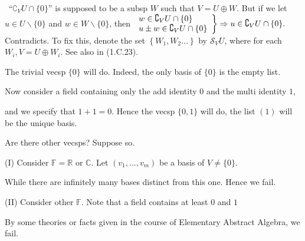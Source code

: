 \documentclass[a4paper, 11pt, UTF8]{article}
\def\Fbb{{\mathbb{F}}}
\def\Rbb{{\mathbb{R}}}
\def\Cbb{{\mathbb{C}}}
\def\BulletPoint{{\small\bullet}}
\def\EndI{\hspace{-4.3pt}}
\def\HI{\quad\hspace{6.5pt}}
\def\HII{\quad\hspace{7.5pt}}
\def\NOTICE{{\tgnr\large N{\footnotesize OTICE}\;}}
\begin{document}
\begin{large}
\BulletPoint \,\hspace{1pt}\TextB{}
$“\complement_V U \cap \{0\}”$ is supposed to be a subsp $W$ such that $V=U\oplus W$.\TextB{}
But if we let $u\in U\backslash\{0\}$ and $w\in W\backslash\{0\}$, then $\MathRightBrace{l}{w\in\complement_V U \cap \{0\}\\ u\pm w\in\complement_V U \cap \{0\} }\Rightarrow u\in\complement_V U \cap \{0\}.$ Contradicts.\vspace{4pt}\TextB{}
To fix this, {\Large denote the set $\left\{W_1,W_2\dots\right\}$ by $\mathcal{S}_V U$,} {\small where for each $W_i,V=U\oplus W_i$. See also in (1.C.23).}\par\SepLine\par

The trivial vecsp $\{0\}$ will do. Indeed, the only basis of $\{0\}$ is the empty list.\par\quad
Now consider a field containing only the add identity $0$ and the multi identity $1$,\par\quad
and we specify that $1+1=0.$ Hence the vecsp $\{0,1\}$ will do, the list $(1)$ will be the unique basis.\par\quad
Are there other vecsps? Suppose so.\par\quad
(I) Consider $\Fbb=\Rbb$ or $\Cbb$. Let $(v_1,\dots,v_m)$ be a basis of $V\neq\{0\}$.\par\quad\HI
While there are infinitely many bases distinct from this one. Hence we fail.\par\quad\EndI
(II) Consider other $\Fbb.$ Note that a field contains at least $0$ and $1$\par\quad\HII
By {\tgsc some theories or facts} given in the course of Elementary Abstract Algebra, we fail.\PfEnd
\SepLine\par
%


\end{large}
\end{document}
